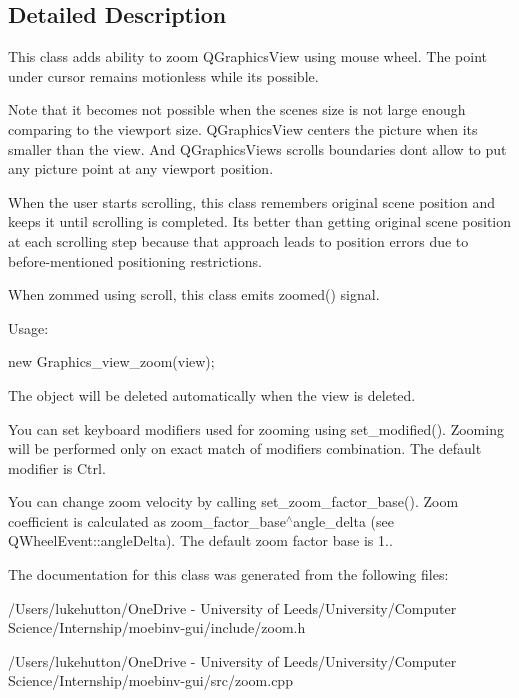 \subsection{Detailed Description}
This class adds ability to zoom Q\+Graphics\+View using mouse wheel. The point under cursor remains motionless while it\textquotesingle{}s possible.

Note that it becomes not possible when the scene\textquotesingle{}s size is not large enough comparing to the viewport size. Q\+Graphics\+View centers the picture when it\textquotesingle{}s smaller than the view. And Q\+Graphics\+View\textquotesingle{}s scrolls boundaries don\textquotesingle{}t allow to put any picture point at any viewport position.

When the user starts scrolling, this class remembers original scene position and keeps it until scrolling is completed. It\textquotesingle{}s better than getting original scene position at each scrolling step because that approach leads to position errors due to before-\/mentioned positioning restrictions.

When zommed using scroll, this class emits zoomed() signal.

Usage\+:

new Graphics\+\_\+view\+\_\+zoom(view);

The object will be deleted automatically when the view is deleted.

You can set keyboard modifiers used for zooming using set\+\_\+modified(). Zooming will be performed only on exact match of modifiers combination. The default modifier is Ctrl.

You can change zoom velocity by calling set\+\_\+zoom\+\_\+factor\+\_\+base(). Zoom coefficient is calculated as zoom\+\_\+factor\+\_\+base$^\wedge$angle\+\_\+delta (see Q\+Wheel\+Event\+::angle\+Delta). The default zoom factor base is 1.. 

The documentation for this class was generated from the following files\+:\begin{DoxyCompactItemize}
\item 
/\+Users/lukehutton/\+One\+Drive -\/ University of Leeds/\+University/\+Computer Science/\+Internship/moebinv-\/gui/include/zoom.\+h\item 
/\+Users/lukehutton/\+One\+Drive -\/ University of Leeds/\+University/\+Computer Science/\+Internship/moebinv-\/gui/src/zoom.\+cpp\end{DoxyCompactItemize}
